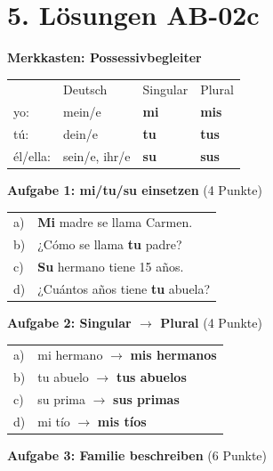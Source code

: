 \documentclass[11pt, a4paper]{article}
\newcommand{\sequenz}{02}
\newcommand{\block}{c}
\newcommand{\loesung}[1]{\textcolor{loesung}{\textbf{#1}}}
\begin{document}

\section*{5. Lösungen AB-\sequenz\block}

\textbf{Merkkasten: Possessivbegleiter}

\begin{tabular}{llll}
& Deutsch & Singular & Plural \\
yo: & mein/e & \loesung{mi} & \loesung{mis} \\
tú: & dein/e & \loesung{tu} & \loesung{tus} \\
él/ella: & sein/e, ihr/e & \loesung{su} & \loesung{sus} \\
\end{tabular}

\vspace{1em}

\textbf{Aufgabe 1: mi/tu/su einsetzen} (4 Punkte)

\begin{tabular}{ll}
a) & \loesung{Mi} madre se llama Carmen. \\
b) & ¿Cómo se llama \loesung{tu} padre? \\
c) & \loesung{Su} hermano tiene 15 años. \\
d) & ¿Cuántos años tiene \loesung{tu} abuela? \\
\end{tabular}

\vspace{1em}

\textbf{Aufgabe 2: Singular $\rightarrow$ Plural} (4 Punkte)

\begin{tabular}{ll}
a) & mi hermano $\rightarrow$ \loesung{mis hermanos} \\
b) & tu abuelo $\rightarrow$ \loesung{tus abuelos} \\
c) & su prima $\rightarrow$ \loesung{sus primas} \\
d) & mi tío $\rightarrow$ \loesung{mis tíos} \\
\end{tabular}

\vspace{1em}

\textbf{Aufgabe 3: Familie beschreiben} (6 Punkte)
\end{document}
